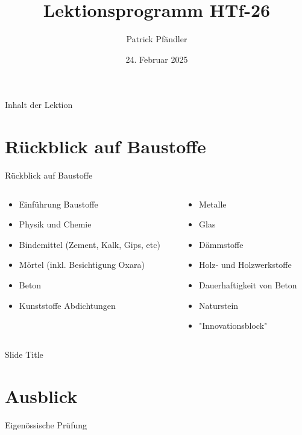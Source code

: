 \def\customoptions{aspectratio=169} %



\title{\textbf{Lektionsprogramm HTf-26}}
\author{Patrick Pfändler}
\date{24. Februar 2025}




\frame{\titlepage}

\begin{frame}{Inhalt der Lektion}
    \tableofcontents
\end{frame}

\folieFragen

\section{Rückblick auf Baustoffe}
\begin{frame}{Rückblick auf Baustoffe}
    \begin{columns}
        \begin{column}{0.5\textwidth}
            \begin{itemize}
                \item[\textbullet] Einführung Baustoffe 
                \item[\textbullet] Physik und Chemie 
                \item[\textbullet] Bindemittel (Zement, Kalk, Gips, etc) 
                \item[\textbullet] Mörtel (inkl. Besichtigung Oxara)
                \item[\textbullet] Beton
                \item[\textbullet] Kunststoffe \Rightarrow Abdichtungen 
            \end{itemize}
        \end{column}

        \begin{column}{0.5\textwidth}
            \begin{itemize}
                \item[\textbullet] Metalle 
                \item[\textbullet] Glas 
                \item[\textbullet] Dämmstoffe 
                \item[\textbullet] Holz- und Holzwerkstoffe 
                \item[\textbullet] Dauerhaftigkeit von Beton
                \item[\textbullet] Naturstein
                \item[\textbullet] "Innovationsblock"
            \end{itemize}
        \end{column}
    \end{columns}
\end{frame}

\begin{frame}{Slide Title}

\end{frame}

\section{Ausblick}
\begin{frame}{Eigenössische Prüfung}

\end{frame}


